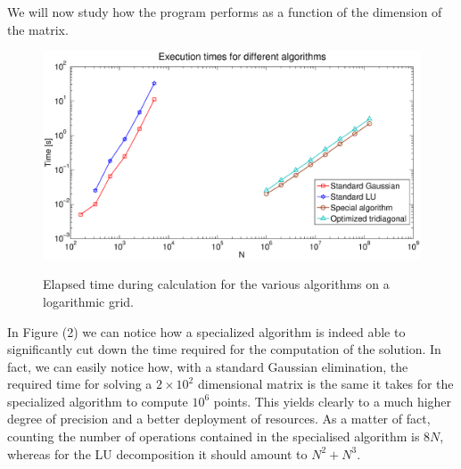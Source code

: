 \documentclass {article}
\begin{document}
We will now study how the program performs as a function of the dimension of the matrix. 

\begin{figure}[H]
 \centering
   {\includegraphics[width=18cm]{times.eps}}
 \caption{Elapsed time during calculation for the various algorithms on a logarithmic grid.}
\end{figure}

In Figure (2) we can notice how a specialized algorithm is indeed able to significantly cut down the time required for the computation of the solution.
In fact, we can easily notice how, with a standard Gaussian elimination, the required time for solving a $2 \times 10^2$  dimensional matrix is the same it takes for the specialized algorithm to compute $10^6$ points. This yields clearly to a much higher degree of precision and a better deployment of resources.
As a matter of fact, counting the number of operations contained in the specialised algorithm is $8N$, whereas for the LU decomposition it should amount to $N^2+N^3$. 
\end{document}

